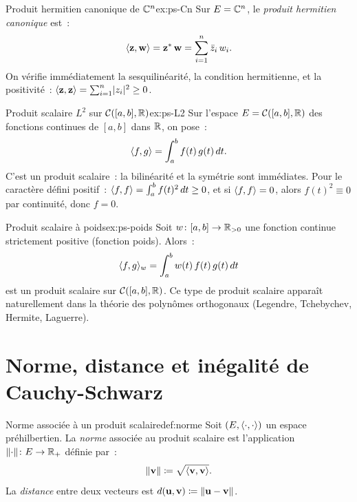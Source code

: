 \begin{example}{Produit hermitien canonique de ${\mathbb{C}}^n$}{ex:ps-Cn}
  Sur $E={\mathbb{C}}^n$, le \emph{produit hermitien canonique} est~:
  \[
    \langle\mathbf{z},\mathbf{w}\rangle
    ={\mathbf{z}}^{*}\,\mathbf{w}
    =\sum_{i=1}^n \bar{z}_i\,w_i.
  \]
  On vérifie immédiatement la sesquilinéarité, la condition hermitienne,
  et la positivité~:
  $\langle\mathbf{z},\mathbf{z}\rangle=\sum_{i=1}^n\lvert z_i\rvert^2\geq 0$.
\end{example}

\begin{example}{Produit scalaire $L^2$ sur $\mathcal{C}([a,b],{\mathbb{R}})$}{ex:ps-L2}
  Sur l'espace $E=\mathcal{C}([a,b],{\mathbb{R}})$ des fonctions continues de
  $[a,b]$ dans ${\mathbb{R}}$, on pose~:
  \[
    \langle f,g\rangle=\int_a^b f(t)\,g(t)\,dt.
  \]
  C'est un produit scalaire~: la bilinéarité et la symétrie sont
  immédiates. Pour le caractère défini positif~:
  $\langle f,f\rangle=\int_a^b f(t)^2\,dt\geq 0$, et si
  $\langle f,f\rangle=0$, alors $f(t)^2\equiv 0$ par continuité, donc
  $f=0$.
\end{example}

\begin{example}{Produit scalaire à poids}{ex:ps-poids}
  Soit $w\colon[a,b]\to{\mathbb{R}}_{>0}$ une fonction continue strictement
  positive (fonction poids). Alors~:
  \[
    \langle f,g\rangle_w=\int_a^b w(t)\,f(t)\,g(t)\,dt
  \]
  est un produit scalaire sur $\mathcal{C}([a,b],{\mathbb{R}})$.
  Ce type de produit scalaire apparaît naturellement dans la théorie
  des polynômes orthogonaux (Legendre, Tchebychev, Hermite, Laguerre).
\end{example}

\section{Norme, distance et inégalité de Cauchy-Schwarz}%
\label{sec:norme-cauchy-schwarz}

\begin{definition}{Norme associée à un produit scalaire}{def:norme}
  Soit $(E,\langle\cdot,\cdot\rangle)$ un espace préhilbertien. La
  \emph{norme} associée au produit scalaire est l'application
  $\lVert\cdot\rVert\colon E\to{\mathbb{R}}_+$ définie par~:
  \[
    \lVert\mathbf{v}\rVert\coloneqq\sqrt{\langle\mathbf{v},\mathbf{v}\rangle}.
  \]
  La \emph{distance} entre deux vecteurs est
  $d(\mathbf{u},\mathbf{v})\coloneqq\lVert\mathbf{u}-\mathbf{v}\rVert$.
\end{definition}

